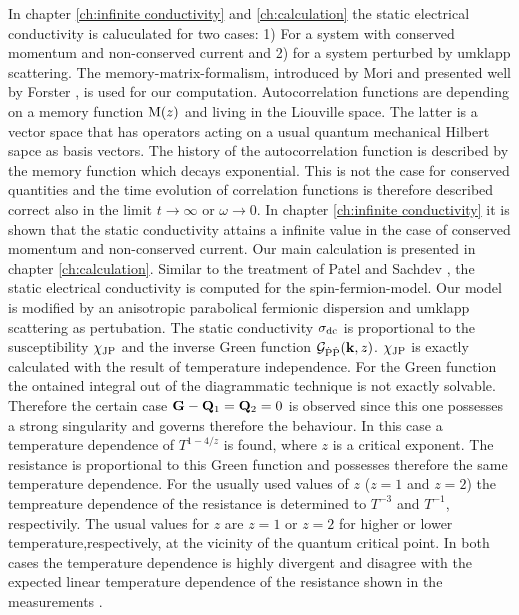 In chapter \ref{ch:infinite conductivity} and \ref{ch:calculation} the static electrical conductivity is caluculated for two cases:
1) For a system with conserved momentum and non-conserved current and
2) for a system perturbed by umklapp scattering.
The memory-matrix-formalism, introduced by Mori \cite{Mori} and presented well by Forster \cite{Forster}, is used for our computation.
Autocorrelation functions are depending on a memory function $\mathrm{M}(z)$ and living in the Liouville space.
The latter is a vector space that has operators acting on a usual quantum mechanical Hilbert sapce as basis vectors.
The history of the autocorrelation function is described by the memory function which decays exponential.
This is not the case for conserved quantities and the time evolution of correlation functions is therefore described correct also in the limit $t\to\infty$ or $\omega\to0$.
In chapter \ref{ch:infinite conductivity} it is shown that the static conductivity attains a infinite value in the case of conserved momentum and non-conserved current.
Our main calculation is presented in chapter \ref{ch:calculation}.
Similar to the treatment of Patel and Sachdev \cite{Patel&Sachdev}, the static electrical conductivity is computed for the spin-fermion-model.
Our model is modified by an anisotropic parabolical fermionic dispersion and umklapp scattering as pertubation.
The static conductivity $\sigma_{\mathrm{dc}}$ is proportional to the susceptibility $\chi_{\mathrm{JP}}$ and the inverse Green function $\mathcal{G}_{\dot{\mathrm{P}}\dot{\mathrm{P}}}(\vb{k},z)$.
$\chi_{\mathrm{JP}}$ is exactly calculated with the result of temperature independence.
For the Green function the ontained integral out of the diagrammatic technique is not exactly solvable.
Therefore the certain case $\vb{G}-\vb{Q}_{1} = \vb{Q}_{2} = 0$ is observed since this one possesses a strong singularity and governs therefore the behaviour.
In this case a temperature dependence of $T^{1-4/z}$ is found, where $z$ is a critical exponent.
The resistance is proportional to this Green function and possesses therefore the same temperature dependence.
For the usually used values of $z$ ($z=1$ and $z=2$) the tempreature dependence of the resistance is determined to $T^{-3}$ and $T^{-1}$, respectivily.
The usual values for $z$ are $z=1$ or $z=2$ for higher or lower temperature,respectively, at the vicinity of the quantum critical point.
In both cases the temperature dependence is highly divergent and disagree with the expected linear temperature dependence of the resistance shown in the measurements \cite{Loehneysen}.

